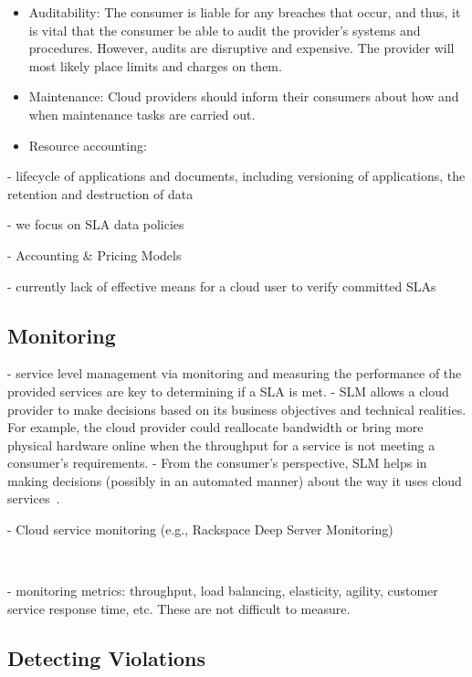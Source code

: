 \begin{itemize}
 \item Auditability: The consumer is liable for any breaches that occur, and thus, it is  vital that the consumer be able to audit the provider's systems and procedures. However, audits are disruptive and expensive. The provider will most likely place limits and charges on them.
 
 \item Maintenance: Cloud providers should inform their consumers about how and when maintenance tasks are carried out.

 \item Resource accounting:
\end{itemize}

- lifecycle of applications and documents, including versioning of applications, the retention and destruction of data 


- we focus on SLA data policies~\cite{Mee12}



- Accounting \& Pricing Models~\cite{MMS13}


- currently lack of effective means for a cloud user to verify committed SLAs


\subsection{Monitoring} \label{sect:sla-monitoring}

- service level management via monitoring and measuring the performance of the provided services are key to determining if a SLA is met.
- SLM allows a cloud provider to make decisions based on its business objectives and technical realities. For example, the cloud provider could reallocate bandwidth or bring more physical hardware online when the throughput for a service is not meeting a consumer's requirements.
- From the consumer's perspective, SLM helps in making decisions (possibly in an automated manner) about the way it uses cloud services~\cite{Ahr+10}.


- Cloud service monitoring (e.g., Rackspace Deep Server Monitoring)

~\cite{ABD+13,FEH+14}

- monitoring metrics: throughput, load balancing, elasticity, agility, customer service response time, etc. These are not difficult to measure.


\subsection{Detecting Violations} \label{sect:sla-detect}

